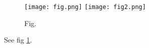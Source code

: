 \documentclass{article}
\begin{document}
  \begin{figure}[h]
    \texttt{[image: fig.png]}
    \texttt{[image: fig2.png]}
    \caption{Fig.}
    \label{fig:fig}
  \end{figure}
  See fig \ref{fig:fig}.
\end{document}
